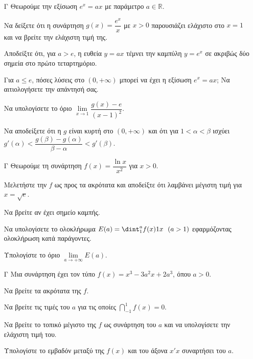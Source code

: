 \begin{thema}{Γ}
Θεωρούμε την εξίσωση $e^x = a x$ με παράμετρο $a \in \mathbb{R}$.
\begin{erwthma}
  \item Να δείξετε ότι η συνάρτηση $g(x) = \dfrac{e^x}{x}$ με $x>0$ παρουσιάζει ελάχιστο στο $x=1$ και να βρείτε την ελάχιστη τιμή της.
  \item Αποδείξτε ότι, για $a > e$, η ευθεία $y = a x$ τέμνει την καμπύλη $y = e^x$ σε ακριβώς δύο σημεία στο πρώτο τεταρτημόριο. 
  \item Για $a \le e$, πόσες λύσεις στο $(0, +\infty)$ μπορεί να έχει η εξίσωση $e^x = a x$; Να αιτιολογήσετε την απάντησή σας.
  \item Να υπολογίσετε το όριο $\lim\limits_{x \to 1} \dfrac{g(x) - e}{(x-1)^2}$.
  \item Να αποδείξετε ότι η $g$ είναι κυρτή στο $(0, +\infty)$ και ότι για $1 < \alpha < \beta$ ισχύει $g'(\alpha) < \dfrac{g(\beta) - g(\alpha)}{\beta - \alpha} < g'(\beta)$.
\end{erwthma}
\end{thema}

\begin{thema}{Γ}
Θεωρούμε τη συνάρτηση $f(x) = \dfrac{\ln x}{x^2}$ για $x > 0$.
\begin{erwthma}
  \item Μελετήστε την $f$ ως προς τα ακρότατα και αποδείξτε ότι λαμβάνει μέγιστη τιμή για $x = \sqrt{e}$.
  \item Να βρείτε αν έχει σημείο καμπής.
  \item Να υπολογίσετε το ολοκλήρωμα $E(a)=\dint_1^a f(x) \d x \ \ (a > 1)$ εφαρμόζοντας ολοκλήρωση κατά παράγοντες. 
  \item Υπολογίστε το όριο $\lim\limits_{a \to +\infty}E(a)$.
\end{erwthma}
\end{thema}

\begin{thema}{Γ}
Μια συνάρτηση έχει τον τύπο $f(x) = x^3 - 3a^2 x + 2a^3$, όπου $a > 0$.
\begin{erwthma}
  \item Να βρείτε τα ακρότατα της $f$.
  \item Να βρείτε τις τιμές του $a$ για τις οποίες $\dint_{-1}^{1}{f(x)}=0$.
  \item Να βρείτε το τοπικό μέγιστο της $f$ ως συνάρτηση του $a$ και να υπολογίσετε την ελάχιστη τιμή του.
  \item Υπολογίστε το εμβαδόν μεταξύ της $f(x)$ και του άξονα $x'x$ συναρτήσει του $a$.
\end{erwthma}
\end{thema}

